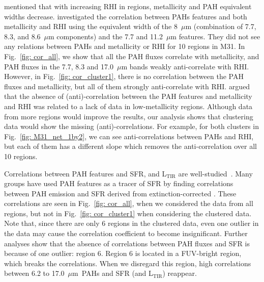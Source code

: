         \cite{Calzetti10} mentioned that with increasing RHI in regions, metallicity and PAH equivalent widths decrease. 
        \cite{Dim15} investigated the correlation between PAHs features and both metallicity and RHI using the equivalent width of the 8~$\mu$m (combination of 7.7, 8.3, and 8.6~$\mu$m components) and the 7.7 and 11.2~$\mu$m features.
        They did not see any relations between PAHs and metallicity or RHI for 10 regions in M31.
        In Fig.~\ref{fig: cor_all}, we show that all the PAH fluxes correlate with metallicity, and PAH fluxes in the 7.7, 8.3 and 17.0~$\mu$m bands weakly anti-correlate with RHI.
        However, in Fig.~\ref{fig: cor_cluster1}, there is no correlation between the PAH fluxes and metallicity, but all of them strongly anti-correlate with RHI.
        \cite{Dim15} argued that the absence of (anti)-correlation between the PAH features and metallicity and RHI was related to a lack of data in low-metallicity regions.
        Although data from more regions would improve the results, our analysis shows that clustering data would show the missing (anti)-correlations.
        For example, for both clusters in Fig.~\ref{fig: M31_net_1by2},
        we can see anti-correlations between PAHs and RHI, but each of them has a different slope which removes the anti-correlation over all 10 regions. 
        
        Correlations between PAH features and SFR, and L$_\mathrm{TIR}$ are well-studied~\citep[e.g.][]{Peeters04,Tielens08}. 
        Many groups have used PAH features as a tracer of SFR by finding correlations between 
        PAH emission and SFR derived from extinction-corrected \halpha \citep[e.g.][]{Calzetti07,Khramtsova13,Shipley16}.
        These correlations are seen in Fig.~\ref{fig: cor_all}, when we considered the data from all regions, but not in Fig.~\ref{fig: cor_cluster1} when considering the clustered data.
        Note that, since there are only 6 regions in the clustered data, even one outlier in the data may cause the correlation coefficient to become insignificant.
        Further analyses show that the absence of correlations between PAH fluxes and SFR is because of one outlier: region 6. Region 6 is located in a FUV-bright region, which breaks the correlations. 
        When we disregard this region, high correlations between 6.2 to 17.0~$\mu$m~PAHs and SFR (and L$_\mathrm{TIR}$) reappear.
        
